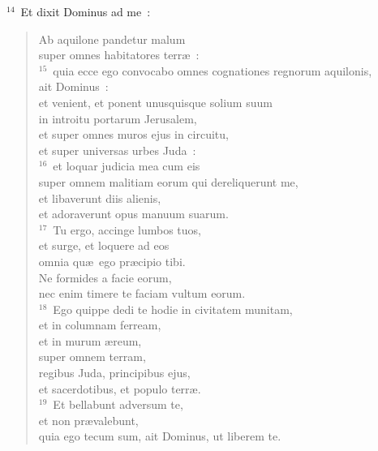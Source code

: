 ${}^{14}$~Et dixit Dominus ad me~: \begin{flushleft}\begin{verse}Ab aquilone pandetur malum\\ super omnes habitatores terr\ae~:\\
${}^{15}$~quia ecce ego convocabo omnes cognationes regnorum aquilonis,\\ ait Dominus~:\\ et venient, et ponent unusquisque solium suum\\ in introitu portarum Jerusalem,\\ et super omnes muros ejus in circuitu,\\ et super universas urbes Juda~:\\
${}^{16}$~et loquar judicia mea cum eis\\ super omnem malitiam eorum qui dereliquerunt me,\\ et libaverunt diis alienis,\\ et adoraverunt opus manuum suarum.\\
${}^{17}$~Tu ergo, accinge lumbos tuos,\\ et surge, et loquere ad eos\\ omnia qu\ae\ ego pr\ae cipio tibi.\\ Ne formides a facie eorum,\\ nec enim timere te faciam vultum eorum.\\
${}^{18}$~Ego quippe dedi te hodie in civitatem munitam,\\ et in columnam ferream,\\ et in murum \ae reum,\\ super omnem terram,\\ regibus Juda, principibus ejus,\\ et sacerdotibus, et populo terr\ae .\\
${}^{19}$~Et bellabunt adversum te,\\ et non pr\ae valebunt,\\ quia ego tecum sum, ait Dominus, ut liberem te.\end{verse}\end{flushleft}


